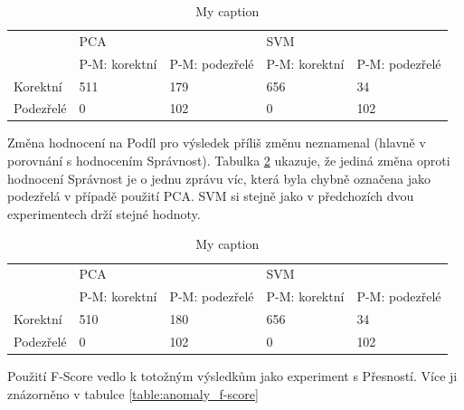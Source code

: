 \documentclass[thesis=M,czech]{FITthesis}[2012/10/20]
\begin{document}
			\begin{table}[htb]\centering
				\centering
				\caption{My caption}
				\label{table:anomaly_precision}
				\begin{tabular}{|l|l|l|l|l|}
					\hline
					\multirow{2}{*}{} & \multicolumn{2}{l|}{PCA}                 & \multicolumn{2}{l|}{SVM}                 \\ 
					& P-M: korektní & P-M: podezřelé & P-M: korektní & P-M: podezřelé \\ \hline
					Korektní          & 511                & 179                 & 656                & 34                  \\ \hline
					Podezřelé         & 0                  & 102                 & 0                  & 102                 \\ \hline
				\end{tabular}
			\end{table}
		
			Změna hodnocení na Podíl pro výsledek příliš změnu neznamenal (hlavně v porovnání s hodnocením Správnost). Tabulka \ref{table:anomaly_recall} ukazuje, že jediná změna oproti hodnocení Správnost je o jednu zprávu víc, která byla chybně označena jako podezřelá v případě použití PCA. SVM si stejně jako v předchozích dvou experimentech drží stejné hodnoty.
			
			\begin{table}[htb]\centering
				\centering
				\caption{My caption}
				\label{table:anomaly_recall}
				\begin{tabular}{|l|l|l|l|l|}
					\hline
					\multirow{2}{*}{} & \multicolumn{2}{l|}{PCA}                 & \multicolumn{2}{l|}{SVM}                 \\ 
					& P-M: korektní & P-M: podezřelé & P-M: korektní & P-M: podezřelé \\ \hline
					Korektní          & 510                & 180                 & 656                & 34                  \\ \hline
					Podezřelé         & 0                  & 102                 & 0                  & 102                 \\ \hline
				\end{tabular}
			\end{table}
		
			Použití F-Score vedlo k totožným výsledkům jako experiment s Přesností. Více ji znázorněno v tabulce \ref{table:anomaly_f-score}
		
\end{document}
